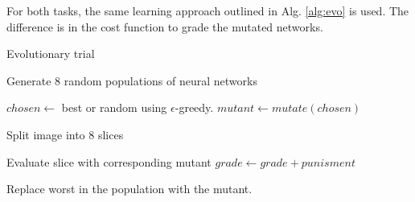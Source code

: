 \documentclass{article}
\begin{document}
	For both tasks, the same learning approach outlined in Alg. \ref{alg:evo} is used.  The difference is in the cost function to grade the mutated networks.




\begin{algorithm}[t, tight]
\caption{Evolutionary trial}
\label{alg:evo}
\begin{algorithmic}

	\STATE Generate 8 random populations of neural networks

		
			\STATE $chosen \gets$ best or random using $\epsilon$-greedy.
			\STATE $mutant \gets mutate(chosen)$
		\ENDFOR
				
		
			\STATE Split image into 8 slices
			
				\STATE Evaluate slice with corresponding mutant
				\STATE $grade \gets grade + punisment$
			\ENDFOR
			
		\ENDFOR

				\STATE Replace worst in the population with the mutant.
			\ENDIF
		\ENDFOR

	\ENDFOR
\end{algorithmic}
\end{algorithm}
\end{document}
